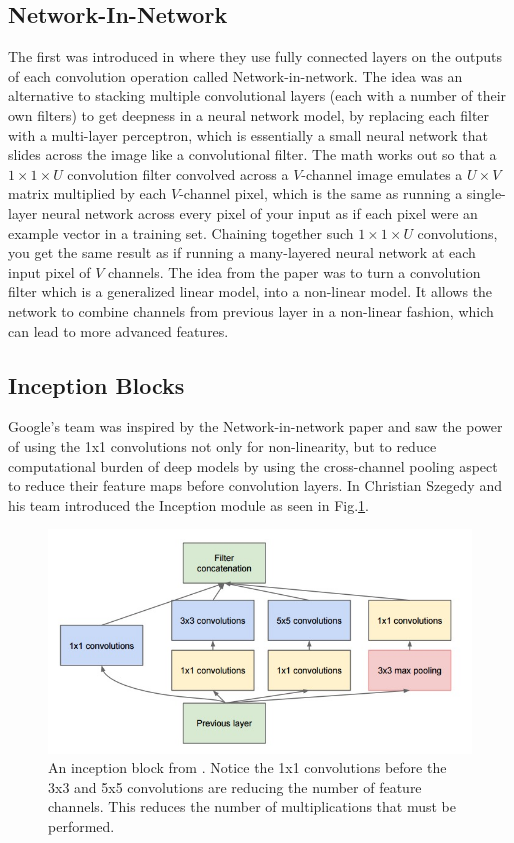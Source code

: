 \subsection{Network-In-Network} 
The first was introduced in \cite{lin2013network} where they use fully connected layers on the outputs of each convolution operation called Network-in-network. 
The idea was an alternative to stacking multiple convolutional layers (each with a number of their own filters) to get deepness in a neural network model, by replacing each filter with a multi-layer perceptron, which is essentially a small neural network that slides across the image like a convolutional filter. 
The math works out so that a $1\times 1\times U$ convolution filter convolved across a $V$-channel image emulates a $U\times V$ matrix multiplied by each $V$-channel pixel, which is the same as running a single-layer neural network across every pixel of your input as if each pixel were an example vector in a training set. 
Chaining together such $1\times 1\times U$ convolutions, you get the same result as if running a many-layered neural network at each input pixel of $V$ channels. 
The idea from the paper was to turn a convolution filter which is a generalized linear model, into a non-linear model. 
It allows the network to combine channels from previous layer in a non-linear fashion, which can lead to more advanced features.

\subsection{Inception Blocks}
Google's team was inspired by the Network-in-network paper and saw the power of using the 1x1 convolutions not only for non-linearity, but to reduce computational burden of deep models by using the cross-channel pooling aspect to reduce their feature maps before convolution layers. 
In \cite{szegedy2015going} Christian Szegedy and his team introduced the Inception module as seen in Fig.\ref{f:inceptionblock}. 
\begin{figure}[h!]
	\centering
		\includegraphics[width=1.0\textwidth]{figures/inceptionblock.png}
	\caption{An inception block from \cite{szegedy2015going}. Notice the 1x1 convolutions before the 3x3 and 5x5 convolutions are reducing the number of feature channels. This reduces the number of multiplications that must be performed.}
	\label{f:inceptionblock}
\end{figure}

